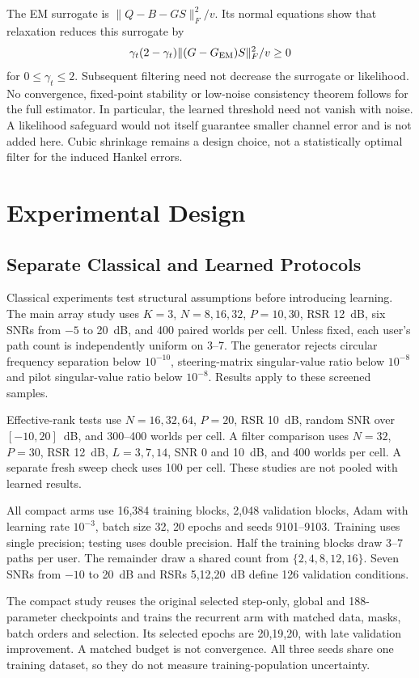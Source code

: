 \documentclass[10pt,journal,letterpaper]{IEEEtran}
\begin{document}
The EM surrogate is $\|Q-B-GS\|_F^2/v$. Its normal equations show that relaxation reduces this surrogate by
\begin{equation}
 \gamma_t(2-\gamma_t)\|(G-G_{\rm EM})S\|_F^2/v\ge0
\end{equation}
for $0\le\gamma_t\le2$. Subsequent filtering need not decrease the surrogate or likelihood. No convergence, fixed-point stability or low-noise consistency theorem follows for the full estimator. In particular, the learned threshold need not vanish with noise. A likelihood safeguard would not itself guarantee smaller channel error and is not added here. Cubic shrinkage remains a design choice, not a statistically optimal filter for the induced Hankel errors.

\section{Experimental Design}
\subsection{Separate Classical and Learned Protocols}
Classical experiments test structural assumptions before introducing learning. The main array study uses $K=3$, $N=8,16,32$, $P=10,30$, RSR 12~dB, six SNRs from $-5$ to 20~dB, and 400 paired worlds per cell. Unless fixed, each user's path count is independently uniform on 3--7. The generator rejects circular frequency separation below $10^{-10}$, steering-matrix singular-value ratio below $10^{-8}$ and pilot singular-value ratio below $10^{-8}$. Results apply to these screened samples.

Effective-rank tests use $N=16,32,64$, $P=20$, RSR 10~dB, random SNR over $[-10,20]$~dB, and 300--400 worlds per cell. A filter comparison uses $N=32$, $P=30$, RSR 12~dB, $L=3,7,14$, SNR 0 and 10~dB, and 400 worlds per cell. A separate fresh sweep check uses 100 per cell. These studies are not pooled with learned results.

All compact arms use 16,384 training blocks, 2,048 validation blocks, Adam with learning rate $10^{-3}$, batch size 32, 20 epochs and seeds 9101--9103. Training uses single precision; testing uses double precision. Half the training blocks draw 3--7 paths per user. The remainder draw a shared count from $\{2,4,8,12,16\}$. Seven SNRs from $-10$ to 20~dB and RSRs 5,12,20~dB define 126 validation conditions.

The compact study reuses the original selected step-only, global and 188-parameter checkpoints and trains the recurrent arm with matched data, masks, batch orders and selection. Its selected epochs are 20,19,20, with late validation improvement. A matched budget is not convergence. All three seeds share one training dataset, so they do not measure training-population uncertainty.
\end{document}
